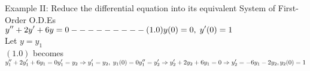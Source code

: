 \documentclass[a4paper 11]{article}
\newcommand{\be}{\(\displaystyle}
\newcommand{\ee}{\)\\[0.2cm]}
\renewcommand{\sp}{\\[0.3cm]}
\newcommand{\spn}[1]{\\[#1]}
\newcommand{\NI}{\noindent}
\newcommand{\imp}{\Rightarrow}
\newcommand{\sprime}{'}
\newcommand{\dprime}{''}
\newcommand{\yn}[1]{y_{#1}}
\begin{document}
\NI Example II: Reduce the differential equation into its equivalent System of First-Order O.D.Es\\[0.2cm]
\be
y\dprime + 2y\sprime + 6y = 0  - - - - - - - - - (1.0) \\[0.2cm]
y(0) = 0, \; y\sprime(0) = 1
\ee
Let \(y =y_1\) \spn{0.1cm}
\((1.0)\) becomes \sp
\be
\yn{1}\dprime + 2\yn{1}\sprime + 6\yn{1} = 0 \spn{0.1cm}
\yn{1}\sprime = \yn{2} \imp \yn{1}\sprime = \yn{2}, \; \yn{1}(0) = 0 \\[0.2cm]
\yn{1}\dprime = \yn{2}\sprime \\[0.2cm]
\imp \yn{2}\sprime + 2y_2 + 6y_1 = 0 \imp \yn{2}\sprime = -6y_1 - 2y_2 , y_2(0) = 1
\ee
\end{document}
